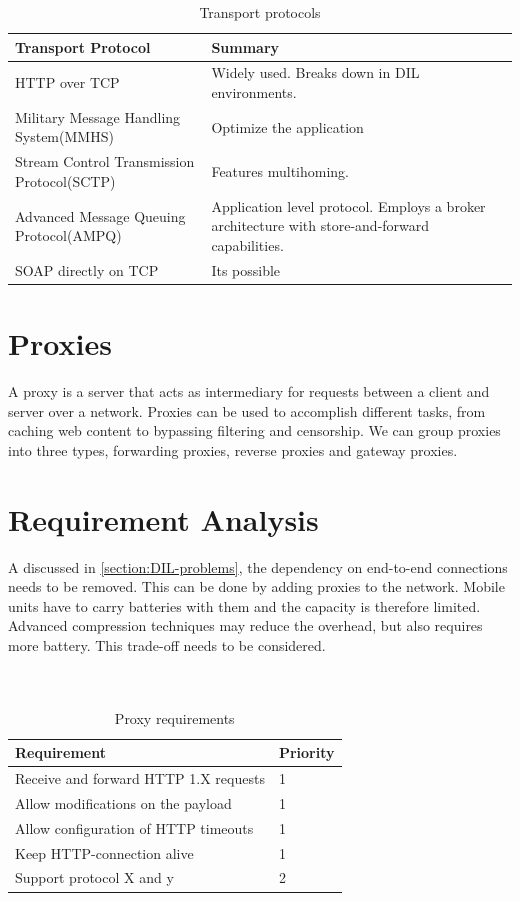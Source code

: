 \documentclass[USenglish]{ifimaster}
\begin{document}
\begin{table}[h]
\begin{tabularx}{\textwidth}{| X | X |}
\hline
  \textbf{Transport Protocol} & \textbf{Summary} \\ \hline
  HTTP over TCP & Widely used. Breaks down in DIL environments.\\ \hline
  Military Message Handling System(MMHS) & Optimize the application\\ \hline
  Stream Control Transmission Protocol(SCTP) & Features multihoming. \\ \hline
  Advanced Message Queuing Protocol(AMPQ) & Application level protocol. Employs a broker architecture with store-and-forward capabilities. \\ \hline
  SOAP directly on TCP & Its possible \\ \hline
\end{tabularx}
\caption{Transport protocols}
\end{table}

\section{Proxies}
A proxy is a server that acts as intermediary for requests between a client and server over a network. Proxies can be used to accomplish different tasks, from caching web content to bypassing filtering and censorship. We can group proxies into three types, forwarding proxies, reverse proxies and gateway proxies.

\section{Requirement Analysis}
A discussed in \cref{section:DIL-problems}, the dependency on end-to-end connections needs to be removed. This can be done by adding proxies to the network.
Mobile units have to carry batteries with them and the capacity is therefore limited. Advanced compression techniques may reduce the overhead, but also requires more battery. This trade-off needs to be considered.
\\ \\ \\
\begin{table}[h]
\begin{tabular}{| l | l |}
\hline
  \textbf{Requirement} & \textbf{Priority} \\ \hline
  Receive and forward HTTP 1.X requests & 1\\ \hline
  Allow modifications on the payload & 1 \\ \hline
  Allow configuration of HTTP timeouts & 1 \\ \hline
  Keep HTTP-connection alive & 1 \\ \hline
  Support protocol X and y & 2 \\ \hline
\end{tabular}
\caption{Proxy requirements}
\end{table}
\end{document}
